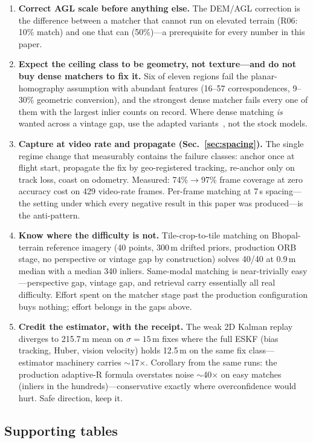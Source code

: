 \documentclass[journal]{IEEEtran}
\begin{document}
\begin{enumerate}
\item \textbf{Correct AGL scale before anything else.} The DEM/AGL correction is the difference between a matcher that cannot run on elevated terrain (R06: 10\% match) and one that can (50\%)---a prerequisite for every number in this paper.
\item \textbf{Expect the ceiling class to be geometry, not texture---and do not buy dense matchers to fix it.} Six of eleven regions fail the planar-homography assumption with abundant features (16--57 correspondences, 9--30\% geometric conversion), and the strongest dense matcher fails every one of them with the largest inlier counts on record. Where dense matching \emph{is} wanted across a vintage gap, use the adapted variants~\cite{satroma,loretta}, not the stock models.
\item \textbf{Capture at video rate and propagate (Sec.~\ref{sec:spacing}).} The single regime change that measurably contains the failure classes: anchor once at flight start, propagate the fix by geo-registered tracking, re-anchor only on track loss, coast on odometry. Measured: 74\%$\to$97\% frame coverage at zero accuracy cost on 429 video-rate frames. Per-frame matching at 7\,s spacing---the setting under which every negative result in this paper was produced---is the anti-pattern.
\item \textbf{Know where the difficulty is not.} Tile-crop-to-tile matching on Bhopal-terrain reference imagery (40 points, 300\,m drifted priors, production ORB stage, no perspective or vintage gap by construction) solves 40/40 at 0.9\,m median with a median 340 inliers. Same-modal matching is near-trivially easy---perspective gap, vintage gap, and retrieval carry essentially all real difficulty. Effort spent on the matcher stage past the production configuration buys nothing; effort belongs in the gaps above.
\item \textbf{Credit the estimator, with the receipt.} The weak 2D Kalman replay diverges to 215.7\,m mean on $\sigma{=}15$\,m fixes where the full ESKF (bias tracking, Huber, vision velocity) holds 12.5\,m on the same fix class---estimator machinery carries $\sim$17$\times$. Corollary from the same runs: the production adaptive-R formula overstates noise $\sim$40$\times$ on easy matches (inliers in the hundreds)---conservative exactly where overconfidence would hurt. Safe direction, keep it.
\end{enumerate}

\subsection{Supporting tables}
\end{document}
